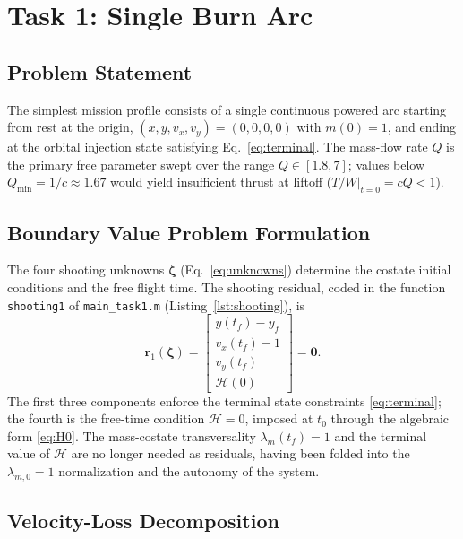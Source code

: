 \documentclass[../main.tex]{subfiles}
\begin{document}
\section{Task 1: Single Burn Arc}\label{sec:task1}

\subsection{Problem Statement}

The simplest mission profile consists of a single continuous powered arc starting from rest at the origin, $(x, y, v_x, v_y) = (0, 0, 0, 0)$ with $m(0) = 1$, and ending at the orbital injection state satisfying Eq.~\eqref{eq:terminal}. The mass-flow rate $Q$ is the primary free parameter swept over the range $Q \in [1.8, 7]$; values below $Q_\mathrm{min} = 1/c \approx 1.67$ would yield insufficient thrust at liftoff ($\left.T/W\right|_{t=0} = cQ < 1$).

\subsection{Boundary Value Problem Formulation}

The four shooting unknowns $\boldsymbol{\zeta}$ (Eq.~\ref{eq:unknowns}) determine the costate initial conditions and the free flight time. The shooting residual, coded in the function \texttt{shooting1} of \texttt{main\_task1.m} (Listing~\ref{lst:shooting}), is
\begin{equation}
    \mathbf{r}_1(\boldsymbol{\zeta}) =
    \begin{bmatrix}
        y(t_f) - y_f \\[2pt]
        v_x(t_f) - 1 \\[2pt]
        v_y(t_f) \\[2pt]
        \mathcal{H}(0)
    \end{bmatrix} = \mathbf{0}.
    \label{eq:residual1}
\end{equation}
The first three components enforce the terminal state constraints \eqref{eq:terminal}; the fourth is the free-time condition $\mathcal{H} = 0$, imposed at $t_0$ through the algebraic form \eqref{eq:H0}. The mass-costate transversality $\lambda_m(t_f) = 1$ and the terminal value of $\mathcal{H}$ are no longer needed as residuals, having been folded into the $\lambda_{m,0} = 1$ normalization and the autonomy of the system.

\subsection{Velocity-Loss Decomposition}
\end{document}
